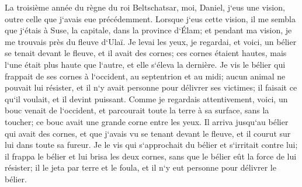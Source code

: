 \verse La troisième année du règne du roi Beltschatsar, moi, Daniel, j`eus une vision, outre celle que j`avais eue précédemment. 
\verse Lorsque j`eus cette vision, il me sembla que j`étais à Suse, la capitale, dans la province d`Élam; et pendant ma vision, je me trouvais près du fleuve d`Ulaï. 
\verse Je levai les yeux, je regardai, et voici, un bélier se tenait devant le fleuve, et il avait des cornes; ces cornes étaient hautes, mais l`une était plus haute que l`autre, et elle s`éleva la dernière. 
\verse Je vis le bélier qui frappait de ses cornes à l`occident, au septentrion et au midi; aucun animal ne pouvait lui résister, et il n`y avait personne pour délivrer ses victimes; il faisait ce qu`il voulait, et il devint puissant. 
\verse Comme je regardais attentivement, voici, un bouc venait de l`occident, et parcourait toute la terre à sa surface, sans la toucher; ce bouc avait une grande corne entre les yeux. 
\verse Il arriva jusqu`au bélier qui avait des cornes, et que j`avais vu se tenant devant le fleuve, et il courut sur lui dans toute sa fureur. 
\verse Je le vis qui s`approchait du bélier et s`irritait contre lui; il frappa le bélier et lui brisa les deux cornes, sans que le bélier eût la force de lui résister; il le jeta par terre et le foula, et il n`y eut personne pour délivrer le bélier. 
